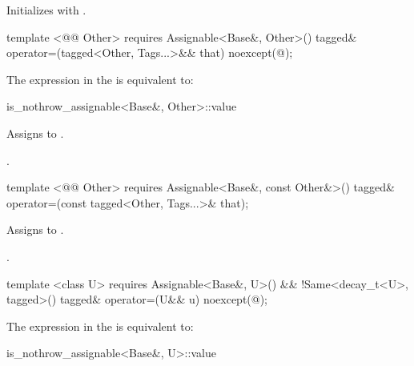 {\begin{itemdescr}
\pnum
\effects Initializes  with .
\end{itemdescr}

\begin{itemdecl}
template <@@ Other>
  requires Assignable<Base&, Other>()
tagged& operator=(tagged<Other, Tags...>&& that) noexcept(@\seebelow@);
\end{itemdecl}

\begin{itemdescr}
\pnum
\remarks The expression in the  is equivalent to:

\begin{codeblock}
is_nothrow_assignable<Base&, Other>::value
\end{codeblock}

\pnum
\effects Assigns  to .

\pnum
\returns {}.
\end{itemdescr}

\begin{itemdecl}
template <@@ Other>
  requires Assignable<Base&, const Other&>()
tagged& operator=(const tagged<Other, Tags...>& that);
\end{itemdecl}

\begin{itemdescr}
\pnum
\effects Assigns  to .

\pnum
\returns {}.
\end{itemdescr}

\begin{itemdecl}
template <class U>
  requires Assignable<Base&, U>() && !Same<decay_t<U>, tagged>()
tagged& operator=(U&& u) noexcept(@\seebelow@);
\end{itemdecl}

\begin{itemdescr}
\pnum
\remarks The expression in the  is equivalent to:

\begin{codeblock}
is_nothrow_assignable<Base&, U>::value
\end{codeblock}


\end{itemdescr}}
